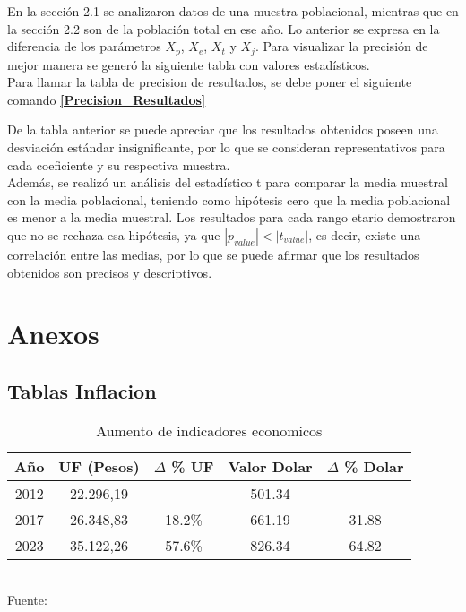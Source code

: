 \documentclass[12pt]{article} %
\begin{document}
En la sección 2.1 se analizaron datos de una muestra poblacional, mientras que en la sección 2.2 son de la población total en ese año.
Lo anterior se expresa en la diferencia de los parámetros $X_p$, $X_e$, $X_t$ y $X_j$. Para visualizar la precisión de mejor manera se generó la
siguiente tabla con valores estadísticos.\\

Para llamar la tabla de precision de resultados, se debe poner el siguiente comando \textbf{\ref{Precision_Resultados}}

De la tabla anterior se puede apreciar que los resultados obtenidos poseen una desviación estándar insignificante, por lo que se 
consideran representativos para cada coeficiente y su respectiva muestra.\\

Además, se realizó un análisis del estadístico t para 
comparar la media muestral con la media poblacional, teniendo como hipótesis cero que la media poblacional es menor a la media muestral.
Los resultados para cada rango etario demostraron que no se rechaza esa hipótesis, ya que \(\left| p_{value} \right| < \left| t_{value} \right|\), es decir, existe una correlación entre las medias, 
por lo que se puede afirmar que los resultados obtenidos son precisos y descriptivos.

\section{Anexos}

\subsection{Tablas Inflacion}

\begin{table}[H]
    \centering
    \caption{Aumento de indicadores economicos}
    \vspace{0.2cm}
    \begin{tabular}{|c|c|c|c|c|}
        \hline
        Año & UF (Pesos) & $\Delta$ \% UF & Valor Dolar & $\Delta$ \% Dolar\\
        \hline
        2012 & 22.296,19 & - & 501.34 & - \\
        2017 & 26.348,83 & 18.2\% & 661.19 & 31.88 \\
        2023 & 35.122,26 & 57.6\% & 826.34 & 64.82 \\
        \hline
    \end{tabular}
    \vspace{0.2cm}
    \\Fuente: \textbf{\cite{sii}}
\end{table}
\end{document}
